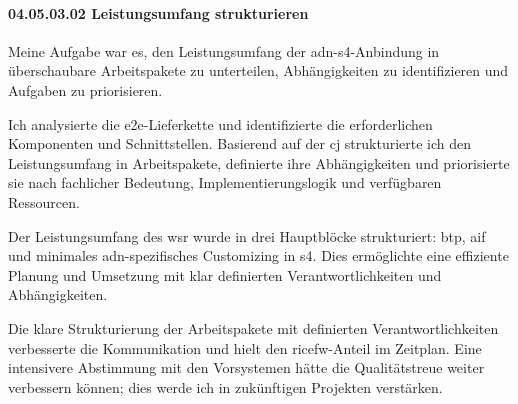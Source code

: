\paragraph*{04.05.03.02 Leistungsumfang strukturieren}
\label{para:04.05.03.02_LeistungsumfangStrukturieren}

\par Meine Aufgabe war es, den Leistungsumfang der \gls{adn}-\gls{s4}-Anbindung in überschaubare Arbeitspakete zu unterteilen, Abhängigkeiten zu identifizieren und Aufgaben zu priorisieren.

\par Ich analysierte die \gls{e2e}-Lieferkette und identifizierte die erforderlichen Komponenten und Schnittstellen. Basierend auf der \gls{cj} strukturierte ich den Leistungsumfang in Arbeitspakete, definierte ihre Abhängigkeiten und priorisierte sie nach fachlicher Bedeutung, Implementierungslogik und verfügbaren Ressourcen.

\par Der Leistungsumfang des \gls{wsr} wurde in drei Hauptblöcke strukturiert: \gls{btp}, \gls{aif} und minimales \gls{adn}-spezifisches Customizing in \gls{s4}. Dies ermöglichte eine effiziente Planung und Umsetzung mit klar definierten Verantwortlichkeiten und Abhängigkeiten.

\par Die klare Strukturierung der Arbeitspakete mit definierten Verantwortlichkeiten verbesserte die Kommunikation und hielt den \gls{ricefw}-Anteil im Zeitplan. Eine intensivere Abstimmung mit den Vorsystemen hätte die Qualitätstreue weiter verbessern können; dies werde ich in zukünftigen Projekten verstärken.